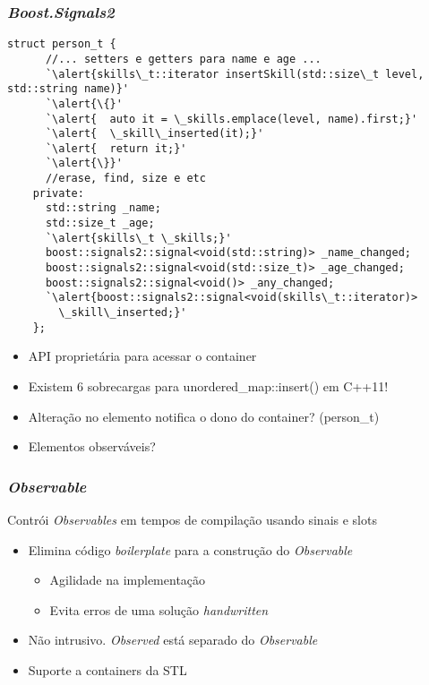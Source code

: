 \documentclass[t]{beamer}
\begin{document}
\begin{frame}[fragile]
  \frametitle{\textit{Boost.Signals2}}

  \begin{lstlisting}[basicstyle=\fontsize{8}{8}\selectfont,escapeinside=`']
    struct person_t {
      //... setters e getters para name e age ...      
      `\alert{skills\_t::iterator insertSkill(std::size\_t level, std::string name)}'
      `\alert{\{}'
      `\alert{  auto it = \_skills.emplace(level, name).first;}'
      `\alert{  \_skill\_inserted(it);}'
      `\alert{  return it;}'
      `\alert{\}}'
      //erase, find, size e etc
    private:    
      std::string _name;
      std::size_t _age;
      `\alert{skills\_t \_skills;}'
      boost::signals2::signal<void(std::string)> _name_changed;
      boost::signals2::signal<void(std::size_t)> _age_changed;
      boost::signals2::signal<void()> _any_changed;
      `\alert{boost::signals2::signal<void(skills\_t::iterator)> 
        \_skill\_inserted;}'
    };
  \end{lstlisting}
      \begin{itemize}
      \item<2->{API proprietária para acessar o container}
      \item<3->{Existem 6 sobrecargas para unordered\_map::insert() em C++11!}
      \item<4->{Alteração no elemento notifica o dono do container? (person\_t)}
      \item<5->{Elementos observáveis?}
      \end{itemize}
\end{frame}

\begin{frame}[fragile]
  \frametitle{\textit{Observable}}
  Contrói \textit{Observables} em tempos de compilação usando sinais e slots
  \begin{itemize}
  \item<1->{Elimina código \textit{boilerplate} para a construção do \textit{Observable}}
    \begin{itemize}
    \item<2->{Agilidade na implementação}
    \item<3->{Evita erros de uma solução \textit{handwritten}}
    \end{itemize}
  \item<4->{Não intrusivo. \textit{Observed} está separado do \textit{Observable}}
  \item<5->{Suporte a containers da STL}
  \end{itemize}
\end{frame}
\end{document}
